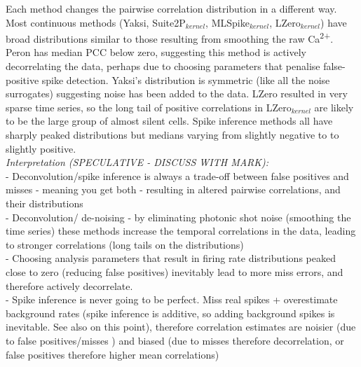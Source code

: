\documentclass[a4paper,10pt,twocolumn]{article}
\begin{document}
Each method changes the pairwise correlation distribution in a different way. Most continuous methods (Yaksi, Suite2P$_{kernel}$, MLSpike$_{kernel}$, LZero$_{kernel}$) have broad distributions similar to those resulting from smoothing the raw Ca\textsuperscript{2+}. Peron has median PCC below zero, suggesting this method is actively decorrelating the data, perhaps due to choosing parameters that penalise false-positive spike detection. Yaksi's distribution is symmetric (like all the noise surrogates) suggesting noise has been added to the data. LZero resulted in very sparse time series, so the long tail of positive correlations in LZero$_{kernel}$ are likely to be the large group of almost silent cells. Spike inference methods all have sharply peaked distributions but medians varying from slightly negative to to slightly positive.\\

\emph{Interpretation (SPECULATIVE - DISCUSS WITH MARK):}\\ 
\indent - Deconvolution/spike inference is always a trade-off between false positives and misses - meaning you get both - resulting in altered pairwise correlations, and their distributions\\
- Deconvolution/ de-noising - by eliminating photonic shot noise (smoothing the time series) these methods increase the temporal correlations in the data, leading to stronger correlations (long tails on the distributions)\\
- Choosing analysis parameters that result in firing rate distributions peaked close to zero (reducing false positives) inevitably lead to more miss errors, and therefore actively decorrelate.\\
\indent - Spike inference is never going to be perfect. Miss real spikes + overestimate background rates (spike inference is additive, so adding background spikes is inevitable. See also \citealt{Ganmor2016-uf} on this point), therefore correlation estimates are noisier (due to false positives/misses ) and biased (due to misses therefore decorrelation, or false positives therefore higher mean correlations)\\




\end{document}
